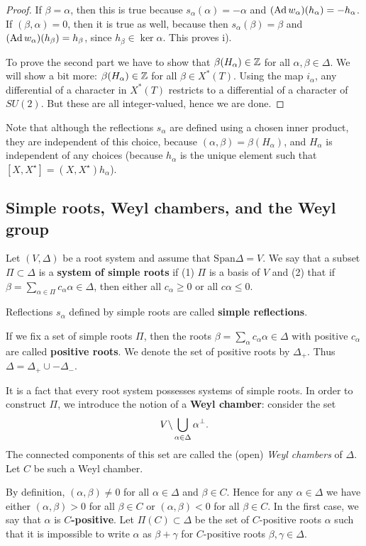 \documentclass[11pt, english]{article}
\begin{document}
\begin{proof}
If $\beta=\alpha$, then this is true because $s_\alpha(\alpha)=-\alpha$ and $(\operatorname{Ad} w_\alpha)(h_\alpha) = -h_\alpha$. If $(\beta,\alpha) = 0$, then it is true as well, because then $s_\alpha(\beta)=\beta$ and $(\operatorname{Ad} w_\alpha)(h_\beta) = h_\beta$, since $h_\beta \in \ker \alpha$. This proves i). 

To prove the second part we have to show that $\beta(H_\alpha) \in \mathbb{Z}$ for all $\alpha, \beta \in \Delta$. We will show a bit more: $\beta(H_\alpha) \in \mathbb{Z}$ for all $\beta \in X^\ast(T)$. Using the map $i_\alpha$, any differential of a  character in $X^\ast(T)$ restricts to a differential of a character of $SU(2)$. But these are all integer-valued, hence we are done.
\end{proof}

Note that although the reflections $s_\alpha$ are defined using a chosen inner product, they are independent of this choice, because $(\alpha,\beta) = \beta(H_\alpha)$, and $H_\alpha$ is independent of any choices (because $h_\alpha$ is the unique element such that $[X,X^\star]=(X,X^\star) h_\alpha$). 

\subsection{Simple roots, Weyl chambers, and the Weyl group}

Let $(V,\Delta)$ be a root system and assume that $\mathrm{Span} \Delta = V$.  We say that a subset $\Pi \subset \Delta$ is a \textbf{system of simple roots} if (1) $\Pi$ is a basis of $V$ and (2) that if $\beta = \sum_{\alpha \in \Pi} c_\alpha \alpha \in \Delta$, then either all $c_\alpha \geq 0$ or all $c \alpha \leq 0$.

Reflections $s_\alpha$ defined by simple roots are called \textbf{simple reflections}.

If we fix a set of simple roots $\Pi$, then the roots $\beta = \sum_\alpha c_\alpha \alpha \in \Delta$ with positive $c_\alpha$ are called \textbf{positive roots}. We denote the set of positive roots by $\Delta_+$. Thus $\Delta = \Delta_+ \cup -\Delta_-$.

It is a fact that every root system possesses systems of simple roots. In order to construct $\Pi$, we introduce the notion of a \textbf{Weyl chamber}: consider the set 
$$
V \backslash \bigcup_{\alpha \in \Delta} \alpha^\perp.
$$
The connected components of this set are called the (open) \emph{Weyl chambers} of $\Delta$. Let $C$ be such a Weyl chamber. 

By definition, $(\alpha, \beta) \neq 0$ for all $\alpha \in \Delta$ and $\beta \in C$. Hence for any $\alpha \in \Delta$ we have either $(\alpha, \beta) > 0$ for all $\beta \in C$ or $(\alpha, \beta) < 0$ for all $\beta \in C$. In the first case, we say that $\alpha$ is \textbf{$C$-positive}. Let $\Pi(C) \subset \Delta$ be the set of $C$-positive roots $\alpha$ such that it is impossible to write $\alpha$ as $\beta+\gamma$ for $C$-positive roots $\beta, \gamma \in \Delta$.
\end{document}
